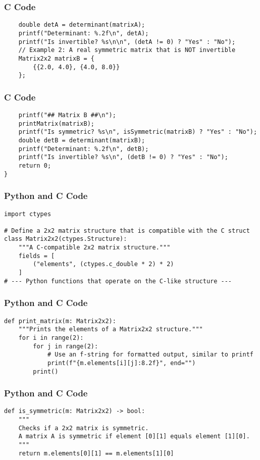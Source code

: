 \documentclass{beamer}
\begin{document}
\begin{frame}[fragile]
\frametitle{C Code}
\begin{lstlisting}
    double detA = determinant(matrixA);
    printf("Determinant: %.2f\n", detA);
    printf("Is invertible? %s\n\n", (detA != 0) ? "Yes" : "No");
    // Example 2: A real symmetric matrix that is NOT invertible
    Matrix2x2 matrixB = {
        {{2.0, 4.0}, {4.0, 8.0}}
    };
\end{lstlisting}
\end{frame}

\begin{frame}[fragile]
\frametitle{C Code}
\begin{lstlisting}
    printf("## Matrix B ##\n");
    printMatrix(matrixB);
    printf("Is symmetric? %s\n", isSymmetric(matrixB) ? "Yes" : "No");
    double detB = determinant(matrixB);
    printf("Determinant: %.2f\n", detB);
    printf("Is invertible? %s\n", (detB != 0) ? "Yes" : "No");
    return 0;
}
\end{lstlisting}
\end{frame}

\begin{frame}[fragile]
\frametitle{Python and C Code}
\begin{lstlisting}
import ctypes

# Define a 2x2 matrix structure that is compatible with the C struct
class Matrix2x2(ctypes.Structure):
    """A C-compatible 2x2 matrix structure."""
    fields = [
        ("elements", (ctypes.c_double * 2) * 2)
    ]
# --- Python functions that operate on the C-like structure ---
\end{lstlisting}
\end{frame}

\begin{frame}[fragile]
\frametitle{Python and C Code}
\begin{lstlisting}
def print_matrix(m: Matrix2x2):
    """Prints the elements of a Matrix2x2 structure."""
    for i in range(2):
        for j in range(2):
            # Use an f-string for formatted output, similar to printf
            print(f"{m.elements[i][j]:8.2f}", end="")
        print()
\end{lstlisting}
\end{frame}

\begin{frame}[fragile]
\frametitle{Python and C Code}
\begin{lstlisting}
def is_symmetric(m: Matrix2x2) -> bool:
    """
    Checks if a 2x2 matrix is symmetric.
    A matrix A is symmetric if element [0][1] equals element [1][0].
    """
    return m.elements[0][1] == m.elements[1][0]
\end{lstlisting}
\end{frame}
\end{document}
